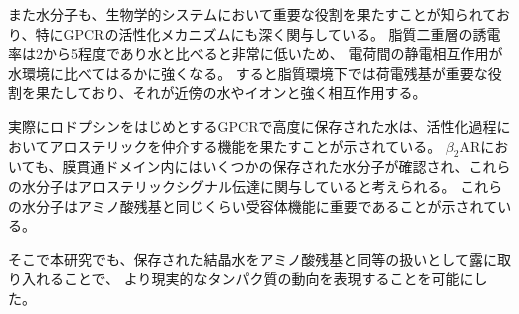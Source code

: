 また水分子も、生物学的システムにおいて重要な役割を果たすことが知られており、特にGPCRの活性化メカニズムにも深く関与している。
脂質二重層の誘電率は2から5程度であり水と比べると非常に低いため、
電荷間の静電相互作用が水環境に比べてはるかに強くなる。
すると脂質環境下では荷電残基が重要な役割を果たしており、それが近傍の水やイオンと強く相互作用する。

実際にロドプシンをはじめとするGPCRで高度に保存された水は、活性化過程においてアロステリックを仲介する機能を果たすことが示されている\cite{angel2009conserved}。
$\beta_2$ARにおいても、膜貫通ドメイン内にはいくつかの保存された水分子が確認され、これらの水分子はアロステリックシグナル伝達に関与していると考えられる。
これらの水分子はアミノ酸残基と同じくらい受容体機能に重要であることが示されている。

そこで本研究でも、保存された結晶水をアミノ酸残基と同等の扱いとして露に取り入れることで、
より現実的なタンパク質の動向を表現することを可能にした。
